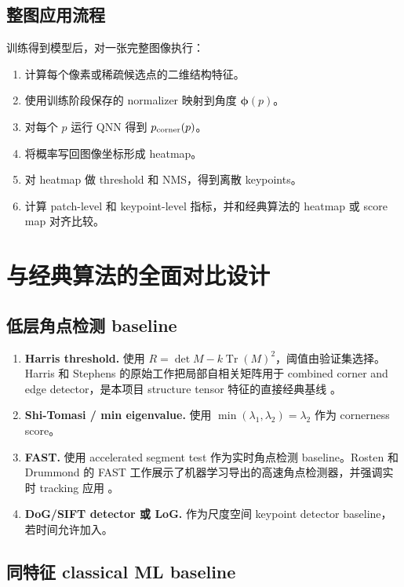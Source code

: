 \documentclass[UTF8,zihao=-4]{ctexart}
\newcommand{\Tr}{\operatorname{Tr}}
\begin{document}
\subsection{整图应用流程}

训练得到模型后，对一张完整图像执行：
\begin{enumerate}[leftmargin=2.0em]
    \item 计算每个像素或稀疏候选点的二维结构特征。
    \item 使用训练阶段保存的 normalizer 映射到角度 $\bm\phi(p)$。
    \item 对每个 $p$ 运行 QNN 得到 $p_{\rm corner}(p)$。
    \item 将概率写回图像坐标形成 heatmap。
    \item 对 heatmap 做 threshold 和 NMS，得到离散 keypoints。
    \item 计算 patch-level 和 keypoint-level 指标，并和经典算法的 heatmap 或 score map 对齐比较。
\end{enumerate}

\section{与经典算法的全面对比设计}

\subsection{低层角点检测 baseline}

\begin{enumerate}[leftmargin=2.0em]
    \item \textbf{Harris threshold.} 使用 $R=\det M-k\Tr(M)^2$，阈值由验证集选择。Harris 和 Stephens 的原始工作把局部自相关矩阵用于 combined corner and edge detector，是本项目 structure tensor 特征的直接经典基线 \cite{harris1988combined}。
    \item \textbf{Shi-Tomasi / min eigenvalue.} 使用 $\min(\lambda_1,\lambda_2)=\lambda_2$ 作为 cornerness score。
    \item \textbf{FAST.} 使用 accelerated segment test 作为实时角点检测 baseline。Rosten 和 Drummond 的 FAST 工作展示了机器学习导出的高速角点检测器，并强调实时 tracking 应用 \cite{rosten2006fast}。
    \item \textbf{DoG/SIFT detector 或 LoG.} 作为尺度空间 keypoint detector baseline，若时间允许加入。
\end{enumerate}

\subsection{同特征 classical ML baseline}
\end{document}
